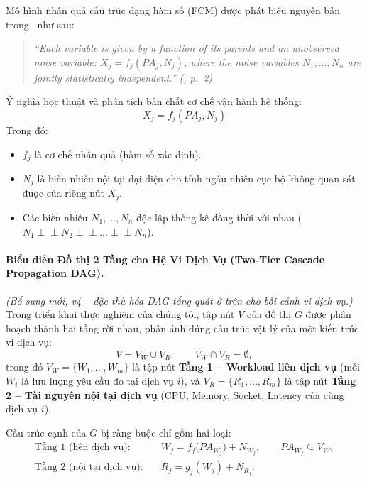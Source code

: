 \documentclass[11pt,a4paper]{article}
\begin{document}
Mô hình nhân quả cấu trúc dạng hàm số (FCM) được phát biểu nguyên bản trong~\cite{janzing2019rootcause} như sau:
\begin{quote}
\itshape
``Each variable is given by a function of its parents and an unobserved noise variable: $X_j = f_j(PA_j, N_j)$, where the noise variables $N_1, \dots, N_n$ are jointly statistically independent.'' (\cite{janzing2019rootcause}, p.~2)
\end{quote}

Ý nghĩa học thuật và phân tích bản chất cơ chế vận hành hệ thống:
\begin{equation}
X_j = f_j(PA_j, N_j)
\end{equation}
Trong đó:
\begin{itemize}
    \item $f_j$ là cơ chế nhân quả (hàm số xác định).
    \item $N_j$ là biến nhiễu nội tại đại diện cho tính ngẫu nhiên cục bộ không quan sát được của riêng nút $X_j$.
    \item Các biến nhiễu $N_1, \dots, N_n$ độc lập thống kê đồng thời với nhau ($N_1 \perp \!\!\! \perp N_2 \perp \!\!\! \perp \dots \perp \!\!\! \perp N_n$).
\end{itemize}

\paragraph{Biểu diễn Đồ thị 2 Tầng cho Hệ Vi Dịch Vụ (Two-Tier Cascade Propagation DAG).}
\label{sec:two-tier-dag}
\textit{(Bổ sung mới, v4 -- đặc thù hóa DAG tổng quát ở trên cho bối cảnh vi dịch vụ.)}
Trong triển khai thực nghiệm của chúng tôi, tập nút $V$ của đồ thị $G$ được phân hoạch thành hai tầng rời nhau, phản ánh đúng cấu trúc vật lý của một kiến trúc vi dịch vụ:
\begin{equation}
V = V_W \cup V_R, \qquad V_W \cap V_R = \emptyset,
\end{equation}
trong đó $V_W = \{W_1, \dots, W_m\}$ là tập nút \textbf{Tầng 1 -- Workload liên dịch vụ} (mỗi $W_i$ là lưu lượng yêu cầu đo tại dịch vụ $i$), và $V_R = \{R_1, \dots, R_m\}$ là tập nút \textbf{Tầng 2 -- Tài nguyên nội tại dịch vụ} (CPU, Memory, Socket, Latency của cùng dịch vụ $i$).

Cấu trúc cạnh của $G$ bị ràng buộc chỉ gồm hai loại:
\begin{align}
\text{Tầng 1 (liên dịch vụ):} \quad & W_j = f_j\big(PA_{W_j}\big) + N_{W_j}, \qquad PA_{W_j} \subseteq V_W, \label{eq:tier1}\\
\text{Tầng 2 (nội tại dịch vụ):} \quad & R_j = g_j(W_j) + N_{R_j}. \label{eq:tier2}
\end{align}
\end{document}

